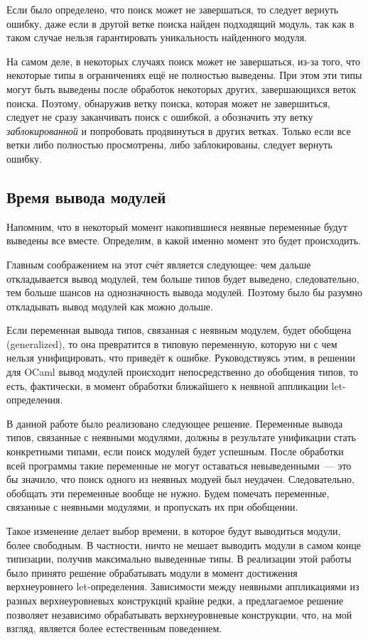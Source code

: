 \documentclass[../diploma.tex]{subfiles}
\begin{document}
Если было определено, что поиск может не завершаться, то следует вернуть ошибку, даже если в другой ветке поиска найден подходящий модуль, так как в таком случае нельзя гарантировать уникальность найденного модуля.

На самом деле, в некоторых случаях поиск может не завершаться, из-за того, что некоторые типы в ограничениях ещё не полностью выведены. При этом эти типы могут быть выведены после обработок некоторых других, завершающихся веток поиска. Поэтому, обнаружив ветку поиска, которая может не завершиться, следует не сразу заканчивать поиск с ошибкой, а обозначить эту ветку \textit{заблокированной} и попробовать продвинуться в других ветках. Только если все ветки либо полностью просмотрены, либо заблокированы, следует вернуть ошибку.

\subsection{Время вывода модулей}\label{time}

Напомним, что в некоторый момент накопившиеся неявные переменные будут выведены все вместе. Определим, в какой именно момент это будет происходить.

Главным соображением на этот счёт является следующее: чем дальше откладывается вывод модулей, тем больше типов будет выведено, следовательно, тем больше шансов на однозначность вывода модулей. Поэтому было бы разумно откладывать вывод модулей как можно дольше.

Если переменная вывода типов, связанная с неявным модулем, будет обобщена (generalized), то она превратится в типовую переменную, которую ни с чем нельзя унифицировать, что приведёт к ошибке. Руководствуясь этим, в решении для OCaml вывод модулей происходит непосредственно до обобщения типов, то есть, фактически, в момент обработки ближайшего к неявной аппликации let-определения.

В данной работе было реализовано следующее решение. Переменные вывода типов, связанные с неявными модулями, должны в результате унификации стать конкретными типами, если поиск модулей будет успешным. После обработки всей программы такие переменные не могут оставаться невыведенными~--- это бы значило, что поиск одного из неявных модуей был неудачен. Следовательно, обобщать эти переменные вообще не нужно. Будем помечать переменные, связанные с неявными модулями, и пропускать их при обобщении. 

Такое изменение делает выбор времени, в которое будут выводиться модули, более свободным. В частности, ничто не мешает выводить модули в самом конце типизации, получив максимально выведенные типы. В реализации этой работы было принято решение обрабатывать модули в момент достижения верхнеуровнего let-определения. Зависимости между неявными аппликациями из разных верхнеуровневых конструкций крайне редки, а предлагаемое решение позволяет независимо обрабатывать верхнеуровневые конструкции, что, на мой взгляд, является более естественным поведением.
\end{document}
